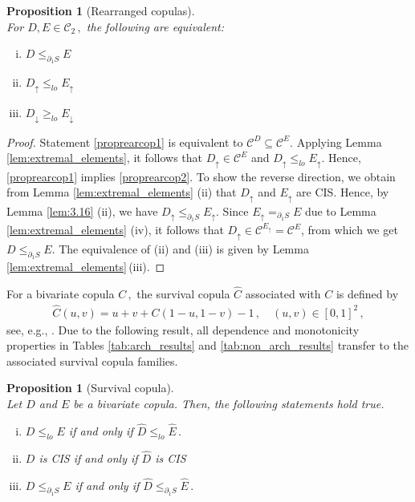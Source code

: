 \documentclass{article}
\newtheorem{proposition}[theorem]{Proposition}
\newcommand{\cC}{\mathcal{C}}
\begin{document}
\begin{proposition}[Rearranged copulas]\label{proprearcop}~\\
    For \(D,E\in \cC_2\,,\) 
    the following are equivalent:
    \begin{enumerate}[(i)]
        \item \label{proprearcop1} $ D\leq_{\partial_1 S} E$ 
        \item \label{proprearcop2}$ D_\uparrow \leq_{lo} E_\uparrow $
        \item \label{proprearcop3}$ D_\downarrow \geq_{lo} E_\downarrow$
    \end{enumerate}
\end{proposition}

\begin{proof}
    Statement \eqref{proprearcop1} is equivalent to $\cC^D\subseteq\cC^E$.
    Applying Lemma \ref{lem:extremal_elements}, it follows that $D_\uparrow\in\cC^E$ and $ D_\uparrow \leq_{lo} E_\uparrow $.
    Hence, \eqref{proprearcop1} implies \eqref{proprearcop2}.
    To show the reverse direction, we obtain from Lemma \ref{lem:extremal_elements} (ii) that $D_\uparrow$ and $E_\uparrow$ are CIS.
    Hence, by Lemma \ref{lem:3.16} (ii), we have $ D_\uparrow\leq_{\partial_1 S} E_\uparrow$.
    Since \(E_\uparrow =_{\partial_1 S} E\) due to Lemma \ref{lem:extremal_elements} (iv), it follows that $D_\uparrow\in\cC^{E_\uparrow}=\cC^E$, from which we get $ D\leq_{\partial_1 S} E$.
    The equivalence of (ii) and (iii) is given by Lemma \ref{lem:extremal_elements}\,(iii).
\end{proof}

For a bivariate copula \(C\,,\) the survival copula \(\hat{C}\) associated with \(C\) is defined by
\begin{align}\label{defsurvcop}
    \hat{C}(u,v) = u+v+C(1-u,1-v)-1\,, \quad(u,v)\in [0,1]^2\,,
\end{align}
see, e.g., \cite[Definition 1.7.18]{Durante-2016}.
Due to the following result, all dependence and monotonicity properties in Tables \ref{tab:arch_results} and \ref{tab:non_arch_results} transfer to the associated survival copula families.

\begin{proposition}[Survival copula]~\\
    Let \(D\) and \(E\) be a bivariate copula.
    Then, the following statements hold true.
    \begin{enumerate}[(i)]
        \item \label{frm_lo_survival} \(D\leq_{lo} E\) if and only if \(\hat{D}\leq_{lo} \hat{E}\,.\)
        \item \label{frm_cis_survival}\(D\) is CIS if and only if \(\hat{D}\) is CIS
        \item \label{frm_partial_2_survival}\(D\leq_{\partial_1 S} E\) if and only if \(\hat{D}\leq_{\partial_1 S} \hat{E}\,.\)
    \end{enumerate}
\end{proposition}
\end{document}

